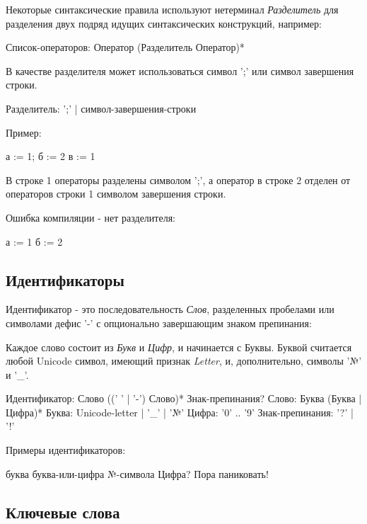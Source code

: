 Некоторые синтаксические правила используют нетерминал \emph{Разделитель} для разделения двух подряд идущих синтаксических конструкций, например:
\begin{Grammar}
Список-операторов: Оператор (Разделитель Оператор)* 
\end{Grammar}

В качестве разделителя может использоваться символ ';' или символ завершения строки.
\begin{Grammar}
Разделитель: ';'  | символ-завершения-строки
\end{Grammar}

\begin{samepage}
Пример:
\begin{Trivil}[vspace=2pt]
а := 1; б := 2
в := 1 
\end{Trivil}
\end{samepage}

В строке 1 операторы разделены символом ';', а оператор в строке 2 отделен от операторов строки 1 символом завершения строки.

Ошибка компиляции - нет разделителя:
\begin{SampleErr}[vspace=2pt]
а := 1 б := 2
\end{SampleErr}

\hypertarget{idents}{%
\subsection{Идентификаторы}\label{lex:idents}}

Идентификатор - это последовательность \emph{Слов}, разделенных пробелами или символами дефис '-' с опционально завершающим знаком препинания:

Каждое слово состоит из \emph{Букв} и \emph{Цифр}, и начинается с Буквы. Буквой считается любой Unicode символ, имеющий признак \emph{Letter}, и, дополнительно, символы '№'
и '\_'. 

\begin{Grammar}
Идентификатор: Слово ((' ' | '-') Слово)* Знак-препинания?
Слово: Буква (Буква | Цифра)*
Буква: Unicode-letter | '_' | '№'
Цифра: '0' .. '9'
Знак-препинания: '?' | '!' 
\end{Grammar}

Примеры идентификаторов:
\begin{Trivil}[vspace=2pt]
буква
буква-или-цифра
№-символа
Цифра?
Пора паниковать!
\end{Trivil}

\hypertarget{keywords}{%
\subsection{Ключевые слова}\label{lex:keywords}}

